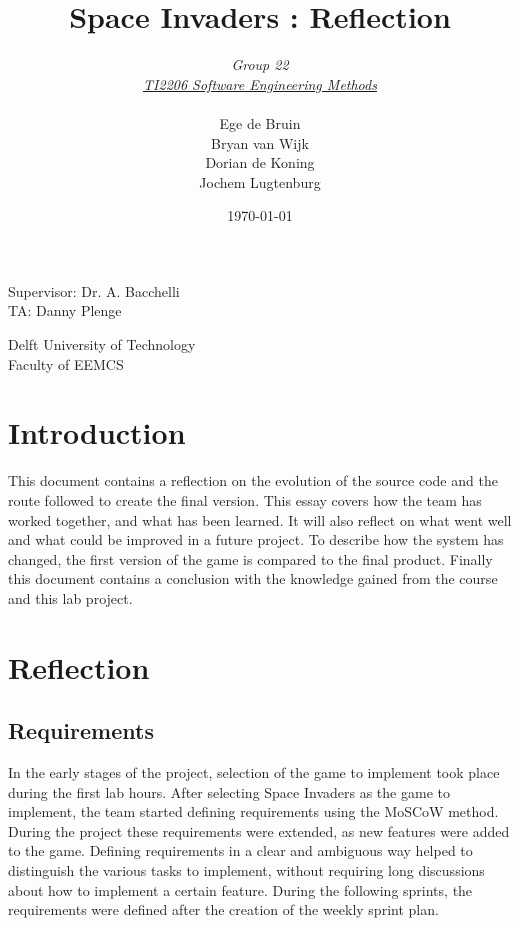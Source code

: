 \documentclass[10pt]{article}
\begin{document}
\title{Space Invaders : Reflection}
\date{\today}
\author{\textit{Group 22}\\ \textit{\underline{TI2206 Software Engineering Methods}} \\
 \\Ege de Bruin \\ Bryan van Wijk \\ Dorian de Koning \\ Jochem Lugtenburg }
 \maketitle  
 \begin{center}
Supervisor: Dr. A. Bacchelli\\
TA: Danny Plenge\\
 \end{center}     
 \begin{center}
 Delft University of Technology\\
 Faculty of EEMCS\\
 \end{center}
 \thispagestyle{empty}
 \pagebreak

\section*{Introduction}
This document contains a reflection on the evolution of the source code and the route followed to create the final version. 
This essay covers how the team has worked together, and what has been learned. It will also reflect on what went well and what could be improved in a future project. To describe how the system has changed, the first version of the game is compared to the final product. Finally this document contains a conclusion with the knowledge gained from the course and this lab project.

\newpage
\section*{Reflection}
\subsection*{Requirements}
In the early stages of the project, selection of the game to implement took place during the first lab hours. After selecting Space Invaders as the game to implement, the team started defining requirements using the MoSCoW method. During the project these requirements were extended, as new features were added to the game. Defining requirements in a clear and ambiguous way helped to distinguish the various tasks to implement, without requiring long discussions about how to implement a certain feature. During the following sprints, the requirements were defined after the creation of the weekly sprint plan.
\end{document}
